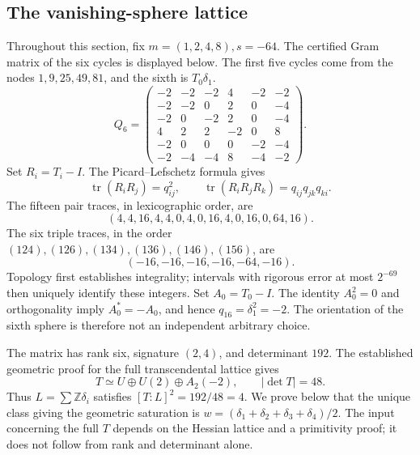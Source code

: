 \documentclass[11pt,a4paper,oneside]{article}
\theoremstyle{plain}
\theoremstyle{definition}
\theoremstyle{remark}
\newcommand{\Z}{\mathbb Z}
\numberwithin{equation}{section}
\begin{document}
\endgroup

\subsection*{The vanishing-sphere lattice}

\begingroup

Throughout this section, fix $m=(1,2,4,8),s=-64$. The certified Gram matrix of the six cycles is displayed below. The first five cycles come from the nodes $1,9,25,49,81$, and the sixth is $T_0\delta_1$.
\begin{equation}Q_6=\begin{pmatrix}
-2&-2&-2&4&-2&-2\\-2&-2&0&2&0&-4\\-2&0&-2&2&0&-4\\
4&2&2&-2&0&8\\-2&0&0&0&-2&-4\\-2&-4&-4&8&-4&-2
\end{pmatrix}.\label{eq:gram}\end{equation}
Set $R_i=T_i-I$. The Picard--Lefschetz formula gives
\begin{equation}\operatorname{tr}(R_iR_j)=q_{ij}^2,\qquad
\operatorname{tr}(R_iR_jR_k)=q_{ij}q_{jk}q_{ki}.\end{equation}
The fifteen pair traces, in lexicographic order, are
\begin{equation}(4,4,16,4,4,0,4,0,16,4,0,16,0,64,16).\end{equation}
The six triple traces, in the order $(124),(126),(134),(136),(146),(156)$, are
\begin{equation}(-16,-16,-16,-16,-64,-16).\end{equation}
Topology first establishes integrality; intervals with rigorous error at most $2^{-69}$ then uniquely identify these integers. Set $A_0=T_0-I$. The identity $A_0^2=0$ and orthogonality imply $A_0^*=-A_0$, and hence $q_{16}=\delta_1^2=-2$. The orientation of the sixth sphere is therefore not an independent arbitrary choice.

The matrix has rank six, signature $(2,4)$, and determinant $192$. The established geometric proof for the full transcendental lattice gives
\begin{equation}T\simeq U\oplus U(2)\oplus A_2(-2),\qquad |\det T|=48.\end{equation}
Thus $L=\sum\Z\delta_i$ satisfies $[T:L]^2=192/48=4$. We prove below that the unique class giving the geometric saturation is $w=(\delta_1+\delta_2+\delta_3+\delta_4)/2$. The input concerning the full $T$ depends on the Hessian lattice and a primitivity proof; it does not follow from rank and determinant alone\cite{dvgeemen}.
\end{document}
